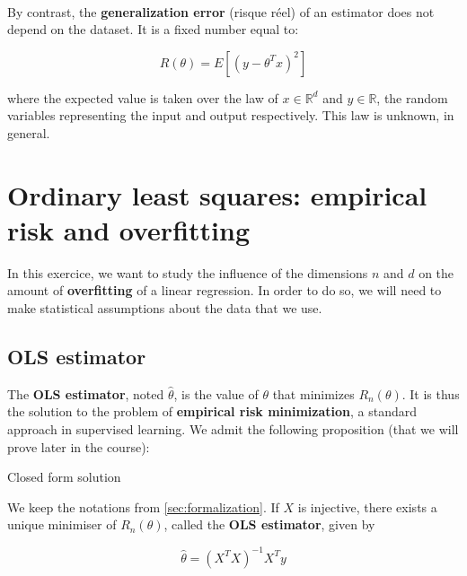\documentclass[
10pt, %
a4paper, %
oneside, %
headinclude,footinclude, %
BCOR5mm, %
]{scrartcl}
\begin{document}
{}
\\

By contrast, the \textbf{generalization error} (risque réel) of an estimator does not depend on the dataset. It is a fixed number equal to:

\begin{equation}
    R(\theta) = E[(y-\theta^Tx)^2]
\end{equation}

where the expected value is taken over the law of $x\in \mathbb{R}^d$ and $y \in\mathbb{R}$, the random variables representing the input and output respectively. This law is unknown, in general.

\pagebreak

\section{\large\color{Blue}Ordinary least squares: empirical risk and overfitting}

In this exercice, we want to study the influence of the dimensions $n$ and $d$ on the amount of \textbf{overfitting} of a linear regression. In order to do so, we will need to make statistical assumptions about the data that we use.

\subsection{OLS estimator}

The \textbf{OLS estimator}, noted $\hat{\theta}$, is the value of $\theta$ that minimizes $R_n(\theta)$. It is thus the solution to the problem of \textbf{empirical risk minimization}, a standard approach in supervised learning. We admit the following proposition (that we will prove later in the course):


\begin{proposition}{Closed form solution}

    We keep the notations from \ref{sec:formalization}. If $X$ is injective, there exists a unique minimiser of $R_n(\theta)$, called the \textbf{{OLS estimator}}, given by

    \begin{equation}
	\label{def:ols}
	\hat{ \theta}= (X^TX)^{-1}X^Ty
    \end{equation}
\end{proposition}
\end{document}
